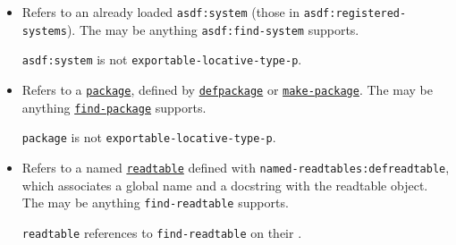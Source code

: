 \begin{itemize}
\item
  \label{x-28ASDF-2FSYSTEM-3ASYSTEM-20MGL-PAX-3ALOCATIVE-29}

  Refers to an already loaded \texttt{asdf:system} (those in
  \texttt{asdf:registered-systems}). The
  may be anything \texttt{asdf:find-system} supports.

  \texttt{asdf:system} is not \texttt{exportable-locative-type-p}.
\item
  \label{x-28PACKAGE-20MGL-PAX-3ALOCATIVE-29}

  Refers to a
  \href{http://www.lispworks.com/documentation/HyperSpec/Body/t_pkg.htm}{\texttt{package}},
  defined by
  \href{http://www.lispworks.com/documentation/HyperSpec/Body/m_defpkg.htm}{\texttt{defpackage}}
  or
  \href{http://www.lispworks.com/documentation/HyperSpec/Body/f_mk_pkg.htm}{\texttt{make-package}}.
  The
  may be anything
  \href{http://www.lispworks.com/documentation/HyperSpec/Body/f_find_p.htm}{\texttt{find-package}}
  supports.

  \texttt{package} is not \texttt{exportable-locative-type-p}.
\item
  \label{x-28READTABLE-20MGL-PAX-3ALOCATIVE-29}

  Refers to a named
  \href{http://www.lispworks.com/documentation/HyperSpec/Body/t_rdtabl.htm}{\texttt{readtable}}
  defined with \texttt{named-readtables:defreadtable}, which associates
  a global name and a docstring with the readtable object. The
  may be anything \texttt{find-readtable} supports.

  \texttt{readtable} references
   to
  \texttt{find-readtable} on their
  .
\end{itemize}

